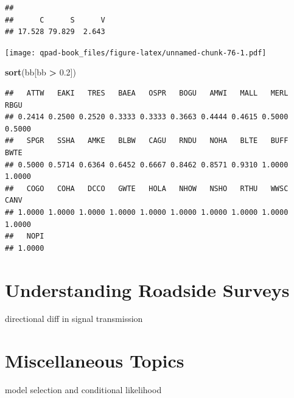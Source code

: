 \documentclass[12pt,]{book}
\newenvironment{Shaded}{\begin{snugshade}}{\end{snugshade}}
\newcommand{\FloatTok}[1]{\textcolor[rgb]{0.00,0.00,0.81}{#1}}
\newcommand{\KeywordTok}[1]{\textcolor[rgb]{0.13,0.29,0.53}{\textbf{#1}}}
\newcommand{\NormalTok}[1]{#1}
\newcommand{\OperatorTok}[1]{\textcolor[rgb]{0.81,0.36,0.00}{\textbf{#1}}}
\newcommand{\StringTok}[1]{\textcolor[rgb]{0.31,0.60,0.02}{#1}}
\begin{document}
\begin{verbatim}
## 
##      C      S      V 
## 17.528 79.829  2.643
\end{verbatim}

\begin{Shaded}
\end{Shaded}

\texttt{[image: qpad-book\_files/figure-latex/unnamed-chunk-76-1.pdf]}

\begin{Shaded}
\begin{Highlighting}[]
\KeywordTok{sort}\NormalTok{(bb[bb }\OperatorTok{>}\StringTok{ }\FloatTok{0.2}\NormalTok{])}
\end{Highlighting}
\end{Shaded}

\begin{verbatim}
##   ATTW   EAKI   TRES   BAEA   OSPR   BOGU   AMWI   MALL   MERL   RBGU 
## 0.2414 0.2500 0.2520 0.3333 0.3333 0.3663 0.4444 0.4615 0.5000 0.5000 
##   SPGR   SSHA   AMKE   BLBW   CAGU   RNDU   NOHA   BLTE   BUFF   BWTE 
## 0.5000 0.5714 0.6364 0.6452 0.6667 0.8462 0.8571 0.9310 1.0000 1.0000 
##   COGO   COHA   DCCO   GWTE   HOLA   NHOW   NSHO   RTHU   WWSC   CANV 
## 1.0000 1.0000 1.0000 1.0000 1.0000 1.0000 1.0000 1.0000 1.0000 1.0000 
##   NOPI 
## 1.0000
\end{verbatim}

\hypertarget{roadsides}{%
\chapter{Understanding Roadside Surveys}\label{roadsides}}

directional diff in signal transmission

\hypertarget{extras}{%
\chapter{Miscellaneous Topics}\label{extras}}

model selection and conditional likelihood
\end{document}
